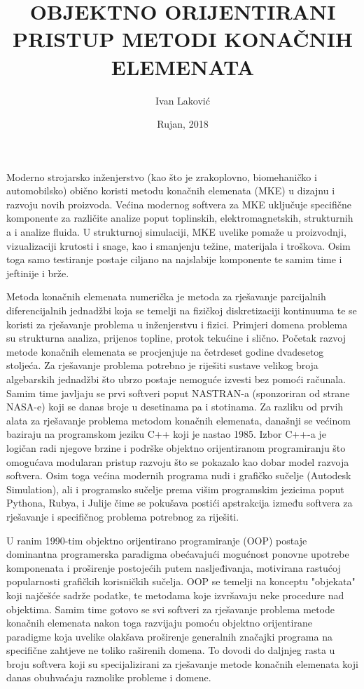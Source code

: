 \documentclass[a4paper,twoside,12pt]{memoir} %
\title{OBJEKTNO ORIJENTIRANI PRISTUP METODI KONAČNIH ELEMENATA}
\author{Ivan Laković}
\date{Rujan, 2018}  %
\begin{document}
\frontmatter


\begin{intro}
Moderno strojarsko inženjerstvo (kao što je zrakoplovno, biomehaničko i automobilsko) obično koristi metodu konačnih elemenata (MKE) u dizajnu i razvoju novih proizvoda. Većina modernog softvera za MKE uključuje specifične komponente za različite analize poput toplinskih, elektromagnetskih, strukturnih a i analize fluida. U strukturnoj simulaciji, MKE uvelike pomaže u proizvodnji, vizualizaciji krutosti i snage, kao i smanjenju težine, materijala i troškova. Osim toga samo testiranje postaje ciljano na najslabije komponente te samim time i jeftinije i brže. \cite{wiki_fem_18} \par

Metoda konačnih elemenata numerička je metoda za rješavanje parcijalnih diferencijalnih jednadžbi koja se temelji na fizičkoj diskretizaciji kontinuuma te se koristi za rješavanje problema u inženjerstvu i fizici. Primjeri domena problema su strukturna analiza, prijenos topline, protok tekućine i slično. Početak razvoj metode konačnih elemenata se procjenjuje na četrdeset godine dvadesetog stoljeća. Za rješavanje problema potrebno je riješiti sustave velikog broja algebarskih jednadžbi što ubrzo postaje nemoguće izvesti bez pomoći računala. Samim time javljaju se prvi softveri poput NASTRAN-a (sponzoriran od strane NASA-e) koji se danas broje u desetinama pa i stotinama. Za razliku od prvih alata za rješavanje problema metodom konačnih elemenata, današnji se većinom baziraju na programskom jeziku C++ koji je nastao 1985. Izbor C++-a je logičan radi njegove brzine i podrške objektno orijentiranom programiranju što omogućava modularan pristup razvoju što se pokazalo kao dobar model razvoja softvera.
Osim toga većina modernih programa nudi i grafičko sučelje (Autodesk Simulation), ali i programsko sučelje prema višim programskim jezicima poput Pythona, Rubya, i Julije čime se pokušava postići apstrakcija između softvera za rješavanje i specifičnog problema potrebnog za riješiti. \cite{wiki_list_of_fem_software} \par

U ranim 1990-tim objektno orijentirano programiranje (OOP) postaje dominantna programerska paradigma obećavajući mogućnost ponovne upotrebe komponenata i proširenje postojećih putem nasljeđivanja, motivirana rastućoj popularnosti grafičkih korisničkih sučelja. OOP se temelji na konceptu "objekata" koji najčešće sadrže podatke, te metodama koje izvršavaju neke procedure nad objektima. Samim time gotovo se svi softveri za rješavanje problema metode konačnih elemenata nakon toga razvijaju pomoću objektno orijentirane paradigme koja uvelike olakšava proširenje generalnih značajki programa na specifične zahtjeve ne toliko raširenih domena. To dovodi do daljnjeg rasta u broju softvera koji su specijalizirani za rješavanje metode konačnih elemenata koji danas obuhvaćaju raznolike probleme i domene. \par


\end{intro}
\end{document}
